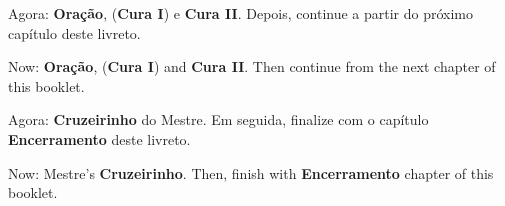 \begin{songs}{}
    \begin{intersong}
      \vfill
      \begin{explanation}[PT]\sffamily\normalsize
        Agora: \textbf{Oração}, (\textbf{Cura I}) e \textbf{Cura II}.
        Depois, continue a partir do próximo capítulo deste livreto.
      \end{explanation}
      \begin{explanation}[EN]\sffamily\normalsize
        Now: \textbf{Oração}, (\textbf{Cura I}) and \textbf{Cura II}.
        Then continue from the next chapter of this booklet.
      \end{explanation}
      \vfill
    \end{intersong}
  
    \end{songs}
    

    
    \begin{songs}{}
      
    \end{songs}

    \begin{songs}{}
      
      
      \begin{intersong}
      \vfill
      \begin{explanation}[PT]\sffamily\normalsize
        Agora: \textbf{Cruzeirinho} do Mestre.
        Em seguida, finalize com o capítulo \textbf{Encerramento} deste livreto.
      \end{explanation}
      \begin{explanation}[EN]\sffamily\normalsize
        Now: Mestre's \textbf{Cruzeirinho}.
        Then, finish with \textbf{Encerramento} chapter of this booklet.
      \end{explanation}
      \vfill
    \end{intersong}
    \end{songs}
    

    
    
